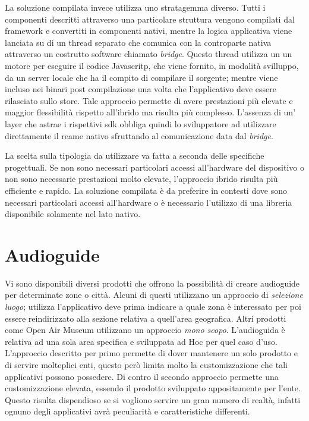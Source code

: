 La soluzione compilata invece utilizza uno stratagemma diverso. Tutti i componenti descritti attraverso una particolare struttura vengono compilati dal framework e convertiti in componenti nativi, mentre la logica applicativa viene lanciata su di un thread separato che comunica con la controparte nativa attraverso un costrutto software chiamato \emph{bridge}. Questo thread utilizza un un motore per eseguire il codice Javascritp, che viene fornito, in modalità svilluppo, da un server locale che ha il compito di compilare il sorgente; mentre viene incluso nei binari post compilazione una volta che l'applicativo deve essere rilasciato sullo store. Tale approccio permette di avere prestazioni più elevate e maggior flessibilità rispetto all'ibrido ma risulta più complesso. L'assenza di un' layer che astrae i rispettivi sdk obbliga quindi lo sviluppatore ad utilizzare direttamente il reame nativo sfruttando al comunicazione data dal \emph{bridge}.\vspace{5mm}

La scelta sulla tipologia da utilizzare va fatta a seconda delle specifiche progettuali. Se non sono necessari particolari accessi all'hardware del dispositivo o non sono necessarie prestazioni molto elevate, l'approccio ibrido risulta più efficiente e rapido. La soluzione compilata è da preferire in contesti dove sono necessari particolari accessi all'hardware o è necessario l'utilizzo di una libreria disponibile solamente nel lato nativo.


\section{Audioguide}\vspace{5mm}

Vi sono disponibili diversi prodotti che offrono la possibilità di creare audioguide per determinate zone o città. Alcuni di questi utilizzano un approccio di \emph{selezione luogo}; utilizza l’applicativo deve prima indicare a quale zona è interessato per poi essere reindirizzato alla sezione relativa a quell’area geografica. Altri prodotti come Open Air Museum utilizzano un approccio \emph{mono scopo}. L’audioguida è relativa ad una sola area specifica e sviluppata ad Hoc per quel caso d'uso. L’approccio descritto per primo permette di dover mantenere un solo prodotto e di servire molteplici enti, questo però limita molto la customizzazione che tali applicativi possono possedere. Di contro il secondo approccio permette una customizzazione elevata, essendo il prodotto sviluppato appositamente per l’ente. Questo risulta dispendioso se si vogliono servire un gran numero di realtà, infatti ognuno degli applicativi avrà peculiarità e caratteristiche differenti.\vspace{5mm}

